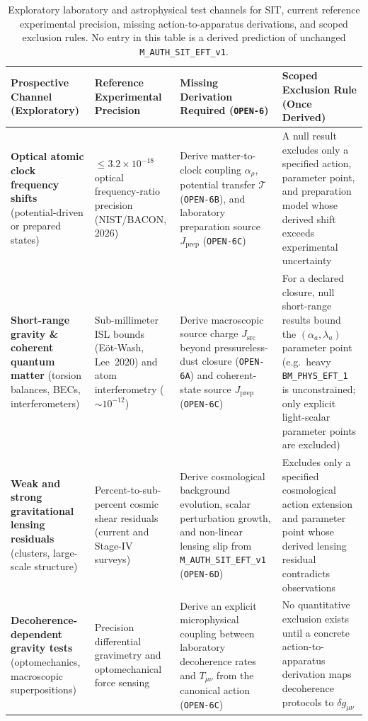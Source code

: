 \begin{table}[htbp]
\centering
\caption{Exploratory laboratory and astrophysical test channels for SIT, current reference experimental precision, missing action-to-apparatus derivations, and scoped exclusion rules. No entry in this table is a derived prediction of unchanged \texttt{M\_AUTH\_SIT\_EFT\_v1}.}
\label{tab:exploratory-missing-derivations}
\footnotesize
\begin{tabular}{|p{3.3cm}|p{2.9cm}|p{4.2cm}|p{4.1cm}|}
\hline
\textbf{Prospective Channel (Exploratory)} & \textbf{Reference Experimental Precision} & \textbf{Missing Derivation Required (\texttt{OPEN-6})} & \textbf{Scoped Exclusion Rule (Once Derived)} \\
\hline
\textbf{Optical atomic clock frequency shifts} (potential-driven or prepared states) & $\le 3.2\times 10^{-18}$ optical frequency-ratio precision (NIST/BACON, 2026) & Derive matter-to-clock coupling $\alpha_\rho$, potential transfer $\mathcal{T}$ (\texttt{OPEN-6B}), and laboratory preparation source $J_{\mathrm{prep}}$ (\texttt{OPEN-6C}) & A null result excludes only a specified action, parameter point, and preparation model whose derived shift exceeds experimental uncertainty \\
\hline
\textbf{Short-range gravity \& coherent quantum matter} (torsion balances, BECs, interferometers) & Sub-millimeter ISL bounds (E\"ot-Wash, Lee~2020) and atom interferometry ($\sim 10^{-12}$) & Derive macroscopic source charge $J_{\mathrm{src}}$ beyond pressureless-dust closure (\texttt{OPEN-6A}) and coherent-state source $J_{\mathrm{prep}}$ (\texttt{OPEN-6C}) & For a declared closure, null short-range results bound the $(\alpha_a, \lambda_a)$ parameter point (e.g.\ heavy \texttt{BM\_PHYS\_EFT\_1} is unconstrained; only explicit light-scalar parameter points are excluded) \\
\hline
\textbf{Weak and strong gravitational lensing residuals} (clusters, large-scale structure) & Percent-to-sub-percent cosmic shear residuals (current and Stage-IV surveys) & Derive cosmological background evolution, scalar perturbation growth, and non-linear lensing slip from \texttt{M\_AUTH\_SIT\_EFT\_v1} (\texttt{OPEN-6D}) & Excludes only a specified cosmological action extension and parameter point whose derived lensing residual contradicts observations \\
\hline
\textbf{Decoherence-dependent gravity tests} (optomechanics, macroscopic superpositions) & Precision differential gravimetry and optomechanical force sensing & Derive an explicit microphysical coupling between laboratory decoherence rates and $T_{\mu\nu}$ from the canonical action (\texttt{OPEN-6C}) & No quantitative exclusion exists until a concrete action-to-apparatus derivation maps decoherence protocols to $\delta g_{\mu\nu}$ \\

\end{tabular}
\end{table}
